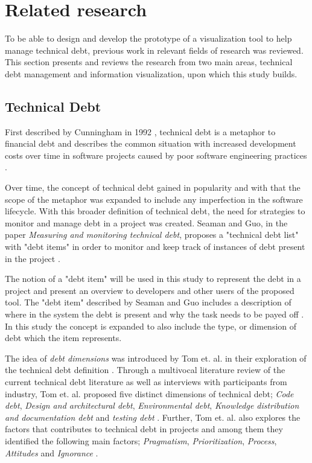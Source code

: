 \section{Related research}
To be able to design and develop the prototype of a visualization tool to help manage technical debt, previous work in relevant fields of research was reviewed.
This section presents and reviews the research from two main areas, technical debt management and information visualization, upon which this study builds.

\subsection{Technical Debt}
First described by Cunningham in 1992 \cite{cunningham_wycash_1992}, technical debt is a metaphor to financial debt and describes the common situation with increased development costs over time in software projects caused by poor software engineering practices \cite{tom_exploration_2013}.

Over time, the concept of technical debt gained in popularity and with that the scope of the metaphor was expanded to include any imperfection in the software lifecycle.
With this broader definition of technical debt, the need for strategies to monitor and manage debt in a project was created.
Seaman and Guo, in the paper \textit{Measuring and monitoring technical debt}, proposes a "technical debt list" with "debt items" in order to monitor and keep track of instances of debt present in the project \cite{seaman_measuring_2011}.

The notion of a "debt item" will be used in this study to represent the debt in a project and present an overview to developers and other users of the proposed tool.
The "debt item" described by Seaman and Guo includes a description of where in the system the debt is present and why the task needs to be payed off \cite{seaman_measuring_2011}.
In this study the concept is expanded to also include the type, or dimension of debt which the item represents.

The idea of \textit{debt dimensions} was introduced by Tom et. al. in their exploration of the technical debt definition \cite{tom_exploration_2013}.
Through a multivocal literature review of the current technical debt literature as well as interviews with participants from industry, Tom et. al. proposed five distinct dimensions of technical debt; \textit{Code debt}, \textit{Design and architectural debt}, \textit{Environmental debt}, \textit{Knowledge distribution and documentation debt} and \textit{testing debt} \cite{tom_exploration_2013}.
Further, Tom et. al. also explores the factors that contributes to technical debt in projects and among them they identified the following main factors; \textit{Pragmatism}, \textit{Prioritization}, \textit{Process}, \textit{Attitudes} and \textit{Ignorance} \cite{tom_exploration_2013}.

